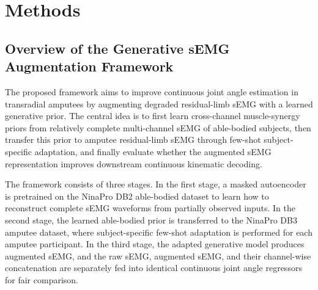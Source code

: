 \documentclass[journal]{IEEEtran}
\begin{document}
\section{Methods}

\subsection{Overview of the Generative sEMG Augmentation Framework}
The proposed framework aims to improve continuous joint angle estimation in transradial amputees by augmenting degraded residual-limb sEMG with a learned generative prior. The central idea is to first learn cross-channel muscle-synergy priors from relatively complete multi-channel sEMG of able-bodied subjects, then transfer this prior to amputee residual-limb sEMG through few-shot subject-specific adaptation, and finally evaluate whether the augmented sEMG representation improves downstream continuous kinematic decoding.

The framework consists of three stages. In the first stage, a masked autoencoder is pretrained on the NinaPro DB2 able-bodied dataset to learn how to reconstruct complete sEMG waveforms from partially observed inputs. In the second stage, the learned able-bodied prior is transferred to the NinaPro DB3 amputee dataset, where subject-specific few-shot adaptation is performed for each amputee participant. In the third stage, the adapted generative model produces augmented sEMG, and the raw sEMG, augmented sEMG, and their channel-wise concatenation are separately fed into identical continuous joint angle regressors for fair comparison.

\end{document}
